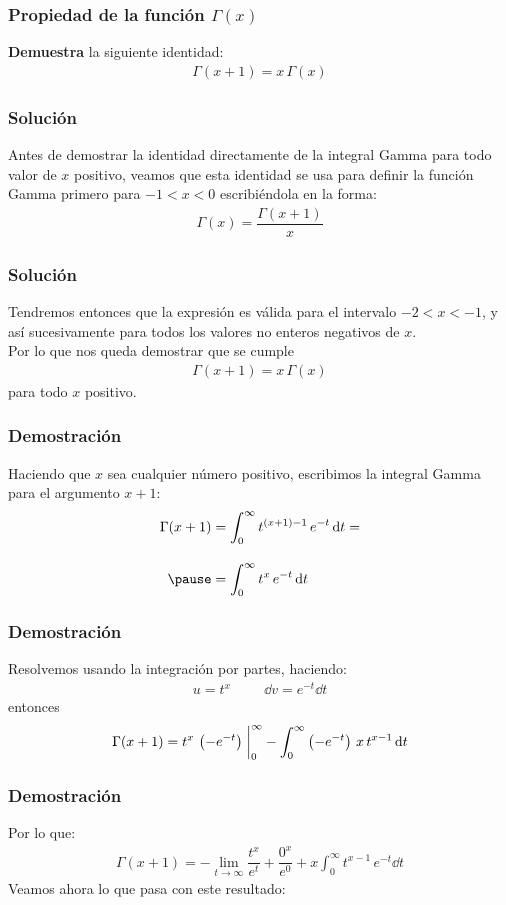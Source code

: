 \documentclass[12pt]{beamer}
\begin{document}
\begin{frame}
\frametitle{Propiedad de la función $\Gamma(x)$}
\textbf{Demuestra} la siguiente identidad:
\begin{align*}
\Gamma (x + 1) = x \, \Gamma (x)
\end{align*}
\end{frame}
\begin{frame}
\frametitle{Solución}
Antes de demostrar la identidad directamente de la integral Gamma para todo valor de $x$ positivo, veamos que esta identidad se usa para definir la función Gamma primero para $-1 < x < 0$ escribiéndola en la forma:
\begin{align*}
\Gamma(x) = \dfrac{\Gamma (x + 1)}{x}
\end{align*}
\end{frame}
\begin{frame}
\frametitle{Solución}
Tendremos entonces que la expresión es válida para el intervalo $-2 < x < -1$, y así sucesivamente para todos los valores no enteros negativos de $x$.
\\
\bigskip
\pause
Por lo que nos queda demostrar que se cumple
\begin{align*}
\Gamma (x + 1) =  x \, \Gamma (x)
\end{align*}
para todo $x$ positivo.
\end{frame}
\begin{frame}
\frametitle{Demostración}
Haciendo que $x$ sea cualquier número positivo, escribimos la integral Gamma para el argumento $x + 1$:
\begin{eqnarray*}
\Gamma (x + 1) &= \displaystyle \int_{0}^{\infty} t^{(x+1)-1} \, e^{-t} \dd{t} = \\[1em] \pause
&= \displaystyle \int_{0}^{\infty} t^{x} \, e^{-t} \dd{t}
\end{eqnarray*}
\end{frame}
\begin{frame}
\frametitle{Demostración}
Resolvemos usando la integración por partes, haciendo:
\begin{align*}
u = t^{x} \hspace{1cm} \dd{v} = e^{-t} \dd{t}
\end{align*}
entonces
\pause
\begin{align*}
\Gamma (x + 1) = t^{x} \, \left( - e^{-t}\right)\eval_{0}^{\infty} - \int_{0}^{\infty} \left( -e^{-t}\right) \, x \, t^{x-1} \dd{t}
\end{align*}
\end{frame}
\begin{frame}
\frametitle{Demostración}
Por lo que:
\begin{align*}
\Gamma (x + 1) = - \lim_{t \to \infty} \dfrac{t^{x}}{e^t} + \dfrac{0^{x}}{e^{0}} + x \int_{0}^{\infty} t^{x-1} \, e^{-t} \dd{t}
\end{align*}
\pause
Veamos ahora lo que pasa con este resultado:
\end{frame}
\end{document}
